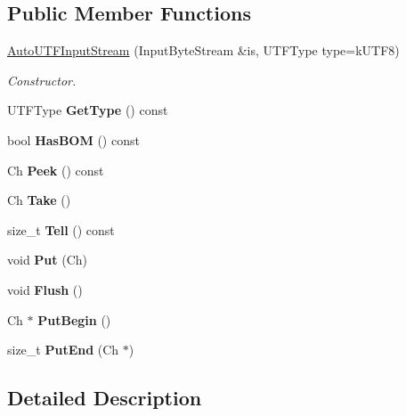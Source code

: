 \subsection*{Public Member Functions}
\begin{DoxyCompactItemize}
\item 
\hyperlink{a02136_a83837fced0971ba26dd9a8ec1575abb0}{Auto\+U\+T\+F\+Input\+Stream} (Input\+Byte\+Stream \&is, U\+T\+F\+Type type=k\+U\+T\+F8)
\begin{DoxyCompactList}\small\item\em Constructor. \end{DoxyCompactList}\item 
\mbox{\label{a02136_ad8e8b71e852db11a841fbba40431c5d1}} 
U\+T\+F\+Type {\bfseries Get\+Type} () const
\item 
\mbox{\label{a02136_a8831def623c28a3ec1d59b75abe5b20e}} 
bool {\bfseries Has\+B\+OM} () const
\item 
\mbox{\label{a02136_a616fbe24878a2026fbc7743acb50438c}} 
Ch {\bfseries Peek} () const
\item 
\mbox{\label{a02136_a652cd1ae8bd848a5ecce4efa1ebd0f38}} 
Ch {\bfseries Take} ()
\item 
\mbox{\label{a02136_a6b847c75309e4ed36957f232b9ce88d1}} 
size\+\_\+t {\bfseries Tell} () const
\item 
\mbox{\label{a02136_a5ea730d1ab715f58ce4f9e3dcd77810a}} 
void {\bfseries Put} (Ch)
\item 
\mbox{\label{a02136_aecc08f52794d761fc1b729907a83dcf8}} 
void {\bfseries Flush} ()
\item 
\mbox{\label{a02136_a761841842c147c0bb1a69bfacbc117a2}} 
Ch $\ast$ {\bfseries Put\+Begin} ()
\item 
\mbox{\label{a02136_a41bd66602f82d344383792feac34f9f7}} 
size\+\_\+t {\bfseries Put\+End} (Ch $\ast$)
\end{DoxyCompactItemize}


\subsection{Detailed Description}
